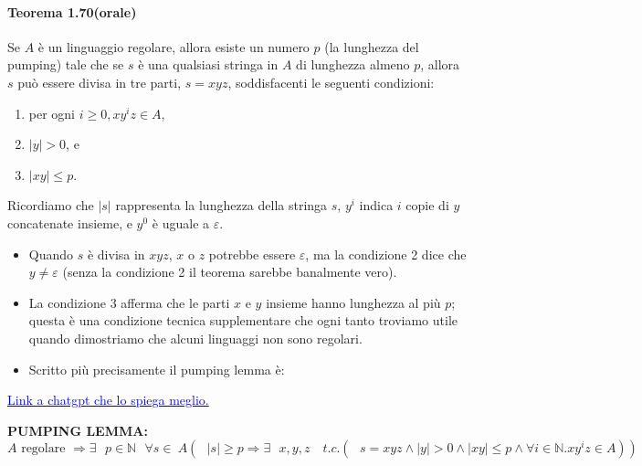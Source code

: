 \documentclass{article}
\begin{document}
\paragraph{Teorema 1.70(orale)}
\label{teorema-1.70}
\text{}
\begin{tcolorbox}[colback=green!10!white, colframe=green!50!black, title=Teorema 1.70]
    Se $A$ è un linguaggio regolare, allora esiste un numero $p$ (la lunghezza del pumping) tale che se $s$ è una qualsiasi stringa in $A$ di lunghezza almeno $p$, allora $s$ può essere divisa in tre parti, $s = xyz$, soddisfacenti le seguenti condizioni:
    \begin{enumerate}
        \item per ogni $i \geq 0, xy^{i}z \in A$,
        \item $|y| > 0$, e
        \item $|xy| \leq p$.
    \end{enumerate}
\end{tcolorbox}

\begin{tcolorbox}[colback=red!10!white, colframe=red!50!black, title=IMPORTANTE!]
    Ricordiamo che $|s|$ rappresenta la lunghezza della stringa $s$, $y^{i}$ indica $i$ copie di $y$ concatenate insieme, e $y^{0}$ è uguale a $\varepsilon$.
\end{tcolorbox}

\begin{itemize}
    \item Quando $s$ è divisa in $xyz$, $x$ o $z$ potrebbe essere $\varepsilon$, ma la condizione 2 dice che $y \neq \varepsilon$ (senza la condizione 2 il teorema sarebbe banalmente vero).
    \item La condizione 3 afferma che le parti $x$ e $y$ insieme hanno lunghezza al più $p$; questa è una condizione tecnica supplementare che ogni tanto troviamo utile quando dimostriamo che alcuni linguaggi non sono regolari.
    \item Scritto più precisamente il pumping lemma è:
\end{itemize}
\vspace{1em}

\href{https://chatgpt.com/share/6759c242-4ec8-8011-9b41-8664075f8a1a}{\textcolor{blue}{Link a chatgpt che lo spiega meglio.}}

\textbf{PUMPING LEMMA:}
$$
A \text{ regolare }\Rightarrow \exists\text{ }p \in \mathbb{N}\text{ }\forall s\in\ A(\text{ }|s| \geq p \Rightarrow \exists \text{ }x,y,z \quad t.c.(\text{ }s = xyz\wedge |y|>0 \wedge |xy|\leq p \wedge \forall i\in \mathbb{N}.xy^{i}z \in A))
$$
\vspace{1em}
\end{document}
